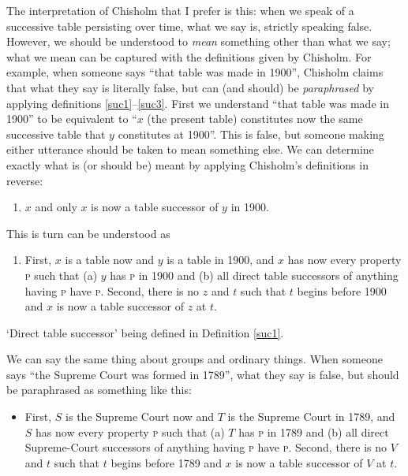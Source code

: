 \documentclass[11pt]{article}
\begin{document}
\begin{spacing}{1.5}
The interpretation of Chisholm that I prefer is this: when we speak of
a successive table persisting over time, what we say is, strictly
speaking false.  However, we should be understood to {\em mean}
something other than what we say; what we mean can be captured with
the definitions given by Chisholm.  For example, when someone says
``that table was made in 1900'', Chisholm claims that what they say is
literally false, but can (and should) be {\em paraphrased} by applying
definitions \ref{suc1}--\ref{suc3}.  First we understand ``that table
was made in 1900'' to be equivalent to ``$x$ (the present table)
constitutes now the same successive table that $y$ constitutes at
1900''.  This is false, but someone making either utterance should be
taken to mean something else.  We can determine exactly what is (or
should be) meant by applying Chisholm's definitions in reverse:

\begin{enumerate}[start=3]
  \item $x$ and only $x$ is now a table successor of $y$ in 1900.
\end{enumerate}
This is turn can be understood as

\begin{enumerate}[start=2]
  \item First, $x$ is a table now and $y$ is a table in 1900, and $x$
    has now every property \textsc{p} such that (a) $y$ has \textsc{p}
    in 1900 and (b) all direct table successors of anything having
    \textsc{p} have \textsc{p}.  Second, there is no $z$ and $t$ such
    that $t$ begins before 1900 and $x$ is now a table successor of
    $z$ at $t$.
\end{enumerate}
`Direct table successor' being defined in Definition \ref{suc1}.

We can say the same thing about groups and ordinary things.  When
someone says ``the Supreme Court was formed in 1789'', what they say
is false, but should be paraphrased as something like this:

\begin{itemize}
  \item First, $S$ is the Supreme Court now and $T$ is the Supreme
    Court in 1789, and $S$ has now every property \textsc{p} such that
    (a) $T$ has \textsc{p} in 1789 and (b) all direct Supreme-Court
    successors of anything having \textsc{p} have \textsc{p}.  Second,
    there is no $V$ and $t$ such that $t$ begins before 1789 and $x$
    is now a table successor of $V$ at $t$.
\end{itemize}


\end{spacing}
\end{document}
